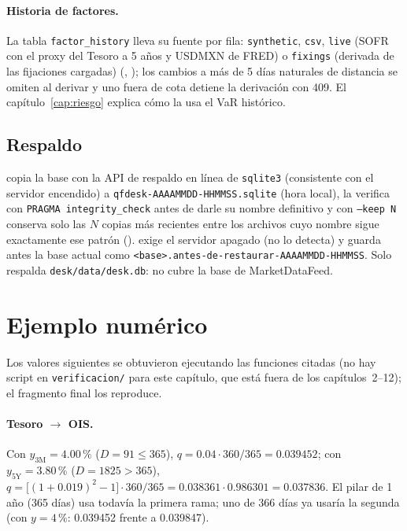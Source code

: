 \begin{sloppypar}
\paragraph{Historia de factores.} La tabla \texttt{factor\_history} lleva su fuente por fila:
\texttt{synthetic}, \texttt{csv}, \texttt{live} (SOFR con el proxy del Tesoro a 5 años y USDMXN de FRED) o
\texttt{fixings} (derivada de las fijaciones cargadas)
(, ); los cambios
a más de 5 días naturales de distancia se omiten al derivar y uno fuera de cota detiene la derivación con 409.
El capítulo~\ref{cap:riesgo} explica cómo la usa el VaR histórico.

\subsection{Respaldo}\label{sec:cap13-respaldo}

 copia la base con la API de respaldo en línea de \texttt{sqlite3}
(consistente con el servidor encendido) a \texttt{qfdesk-AAAAMMDD-HHMMSS.sqlite} (hora local), la verifica con
\texttt{PRAGMA integrity\_check} antes de darle su nombre definitivo y con \texttt{--keep N} conserva solo las $N$
copias más recientes entre los archivos cuyo nombre sigue exactamente ese patrón
().  exige el servidor apagado (no lo
detecta) y guarda antes la base actual como \texttt{<base>.antes-de-restaurar-AAAAMMDD-HHMMSS}. Solo respalda
\texttt{desk/data/desk.db}: no cubre la base de MarketDataFeed.

\section{Ejemplo numérico}\label{sec:cap13-ejemplo}

Los valores siguientes se obtuvieron ejecutando las funciones citadas (no hay script en \texttt{verificacion/}
para este capítulo, que está fuera de los capítulos~2--12); el fragmento final los reproduce.

\paragraph{Tesoro $\to$ OIS.} Con $y_{3\mathrm{M}}=4.00\,\%$ ($D=91\le365$),
$q=0.04\cdot360/365=\num{0.039452}$; con $y_{5\mathrm{Y}}=3.80\,\%$ ($D=1825>365$),
$q=\bigl[(1+0.019)^2-1\bigr]\cdot360/365=0.038361\cdot0.986301=\num{0.037836}$. El pilar de 1 año (365 días) usa
todavía la primera rama; uno de 366 días ya usaría la segunda (con $y=4\,\%$: \num{0.039452} frente a
\num{0.039847}).


\end{sloppypar}
